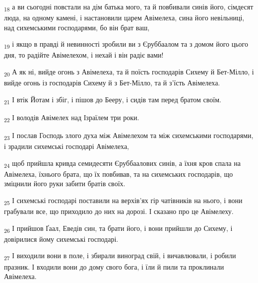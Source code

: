 \begin{tcolorbox}
\textsubscript{18} а ви сьогодні повстали на дім батька мого, та й повбивали синів його, сімдесят люда, на одному камені, і настановили царем Авімелеха, сина його невільниці, над сихемськими господарями, бо він брат ваш,
\end{tcolorbox}
\begin{tcolorbox}
\textsubscript{19} і якщо в правді й невинності зробили ви з Єруббаалом та з домом його цього дня, то радійте Авімелехом, і нехай і він радіє вами!
\end{tcolorbox}
\begin{tcolorbox}
\textsubscript{20} А як ні, вийде огонь з Авімелеха, та й поїсть господарів Сихему й Бет-Мілло, і вийде огонь із господарів Сихему й з Бет-Мілло, та й з'їсть Авімелеха.
\end{tcolorbox}
\begin{tcolorbox}
\textsubscript{21} І втік Йотам і збіг, і пішов до Бееру, і сидів там перед братом своїм.
\end{tcolorbox}
\begin{tcolorbox}
\textsubscript{22} І володів Авімелех над Ізраїлем три роки.
\end{tcolorbox}
\begin{tcolorbox}
\textsubscript{23} І послав Господь злого духа між Авімелехом та між сихемськими господарями, і зрадили сихемські господарі Авімелеха,
\end{tcolorbox}
\begin{tcolorbox}
\textsubscript{24} щоб прийшла кривда семидесяти Єруббаалових синів, а їхня кров спала на Авімелеха, їхнього брата, що їх повбивав, та на сихемських господарів, що зміцнили його руки забити братів своїх.
\end{tcolorbox}
\begin{tcolorbox}
\textsubscript{25} І сихемські господарі поставили на верхів'ях гір чатівників на нього, і вони грабували все, що приходило до них на дорозі. І сказано про це Авімелеху.
\end{tcolorbox}
\begin{tcolorbox}
\textsubscript{26} І прийшов Ґаал, Еведів син, та брати його, і вони прийшли до Сихему, і довірилися йому сихемські господарі.
\end{tcolorbox}
\begin{tcolorbox}
\textsubscript{27} І виходили вони в поле, і збирали виноград свій, і вичавлювали, і робили празник. І входили вони до дому свого бога, і їли й пили та проклинали Авімелеха.
\end{tcolorbox}
